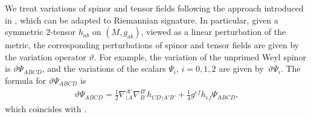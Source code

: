\documentclass[pdftex]{sigma}
\numberwithin{equation}{section}
\begin{document}
We treat variations of spinor and tensor fields following the approach introduced in \cite{backdahl2016formalism},
which can be adapted to Riemannian signature.
In particular, given a symmetric 2-tensor $h_{ab}$ on $(M, g_{ab})$, viewed as a linear perturbation of the metric, the corresponding perturbations of spinor and tensor fields are given by the variation operator $\vartheta$. For example, the variation of the unprimed Weyl spinor is $\vartheta \Psi_{ABCD}$, and the variations of the scalars $\Psi_i$, $i=0,1,2$ are given by~$\vartheta \Psi_i$.
The formula for $\vartheta \Psi_{ABCD}$ is
\begin{align}\label{linWeylSpinor}
\vartheta\Psi_{ABCD}
= \frac{1}{2}\nabla_{(A}^{A'}\nabla_{B}^{B'}h_{CD)A'B'} + \frac{1}{4}g^{ef}h_{ef}\Psi_{ABCD},
\end{align}
which coincides with \cite[equation~(5.7.15)]{PR:I}.
\end{document}
